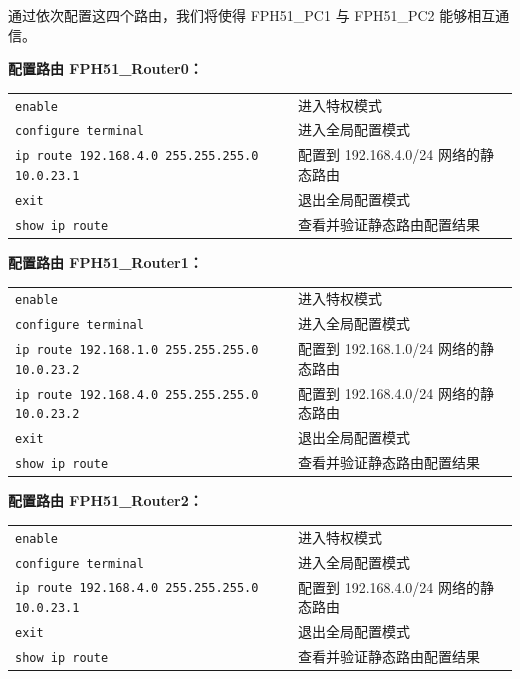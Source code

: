 \documentclass[UTF8,12pt,a4paper]{ctexart}
\begin{document}

通过依次配置这四个路由，我们将使得 FPH51\_PC1 与 FPH51\_PC2 能够相互通信。

\noindent\textbf{配置路由 FPH51\_Router0：}

\medskip

\begin{tabular}{p{7cm} p{7cm}}
\texttt{enable} & 进入特权模式 \\

\texttt{configure terminal} & 进入全局配置模式 \\

\texttt{ip route 192.168.4.0 255.255.255.0 10.0.23.1}
& 配置到 192.168.4.0/24 网络的静态路由 \\

\texttt{exit} & 退出全局配置模式 \\

\texttt{show ip route} & 查看并验证静态路由配置结果 \\
\end{tabular}

\noindent\textbf{配置路由 FPH51\_Router1：}

\medskip

\begin{tabular}{p{7cm} p{7cm}}
\texttt{enable} & 进入特权模式 \\
\texttt{configure terminal} & 进入全局配置模式 \\

\texttt{ip route 192.168.1.0 255.255.255.0 10.0.23.2}
& 配置到 192.168.1.0/24 网络的静态路由 \\

\texttt{ip route 192.168.4.0 255.255.255.0 10.0.23.2}
& 配置到 192.168.4.0/24 网络的静态路由 \\

\texttt{exit} & 退出全局配置模式 \\
\texttt{show ip route} & 查看并验证静态路由配置结果 \\
\end{tabular}

\noindent\textbf{配置路由 FPH51\_Router2：}

\medskip

\begin{tabular}{p{7cm} p{7cm}}
\texttt{enable} & 进入特权模式 \\
\texttt{configure terminal} & 进入全局配置模式 \\

\texttt{ip route 192.168.4.0 255.255.255.0 10.0.23.1}
& 配置到 192.168.4.0/24 网络的静态路由 \\

\texttt{exit} & 退出全局配置模式 \\
\texttt{show ip route} & 查看并验证静态路由配置结果 \\
\end{tabular}
\end{document}
